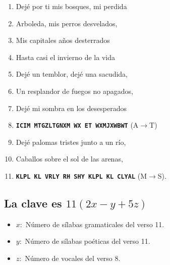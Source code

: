 \documentclass[a4paper,12pt]{article}
\begin{document}
\begin{enumerate}
	\item Dejé por ti mis bosques, mi perdida
	\item Arboleda, mis perros desvelados,
	\item Mis capitales años desterrados
	\item Hasta casi el invierno de la vida
	\item Dejé un temblor, dejé una sacudida,
	\item Un resplandor de fuegos no apagados,
	\item Dejé mi sombra en los desesperados
	\item \textbf{\texttt{ICIM MTGZLTGNXM WX ET WXMJXWBWT}} (A$\to$T)
	\item Dejé palomas tristes junto a un río,
	\item Caballos sobre el sol de las arenas,
	\item \textbf{\texttt{KLPL KL VRLY RH SHY KLPL KL CLYAL}} (M$\to$S).
\end{enumerate}
\subsection*{La clave es $11(2x-y + 5z)$}
\begin{itemize}
	\item $x:$ Número de sílabas gramaticales del verso 11. 
	\item $y:$ Número de sílabas poéticas del verso 11.
	\item $z:$ Número de vocales del verso 8.
\end{itemize}
\end{document}
